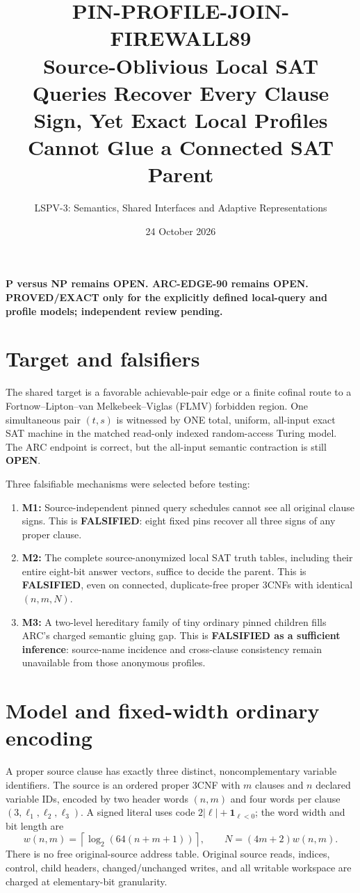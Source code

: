 \documentclass[11pt]{article}
\title{PIN-PROFILE-JOIN-FIREWALL89\\
\large Source-Oblivious Local SAT Queries Recover Every Clause Sign,
Yet Exact Local Profiles Cannot Glue a Connected SAT Parent}
\author{LSPV-3: Semantics, Shared Interfaces and Adaptive Representations}
\date{24 October 2026}
\begin{document}
\maketitle
\begin{center}
\textbf{P versus NP remains OPEN. ARC-EDGE-90 remains OPEN.}\\
\textbf{PROVED/EXACT only for the explicitly defined local-query and profile models; independent review pending.}
\end{center}

\section{Target and falsifiers}
The shared target is a favorable achievable-pair edge or a finite cofinal route to
a Fortnow--Lipton--van Melkebeek--Viglas (FLMV) forbidden region. One simultaneous
pair $(t,s)$ is witnessed by ONE total, uniform, all-input exact SAT machine in
the matched read-only indexed random-access Turing model. The ARC endpoint is
correct, but the all-input semantic contraction is still \textbf{OPEN}.

Three falsifiable mechanisms were selected before testing:
\begin{enumerate}
\item[] \textbf{M1:} Source-independent pinned query schedules cannot see all
original clause signs. This is \textbf{FALSIFIED}: eight fixed pins recover
all three signs of any proper clause.
\item[] \textbf{M2:} The complete source-anonymized local SAT truth tables,
including their entire eight-bit answer vectors, suffice to decide the
parent. This is \textbf{FALSIFIED}, even on connected, duplicate-free
proper 3CNFs with identical $(n,m,N)$.
\item[] \textbf{M3:} A two-level hereditary family of tiny ordinary pinned
children fills ARC's charged semantic gluing gap. This is
\textbf{FALSIFIED as a sufficient inference}: source-name incidence and
cross-clause consistency remain unavailable from those anonymous profiles.
\end{enumerate}

\section{Model and fixed-width ordinary encoding}
A proper source clause has exactly three distinct, noncomplementary variable
identifiers. The source is an ordered proper 3CNF with $m$ clauses and
$n$ declared variable IDs, encoded by two header words $(n,m)$ and four
words per clause $(3,\ell_1,\ell_2,\ell_3)$. A signed literal uses code
$2|\ell|+\mathbf1_{\ell<0}$; the word width and bit length are
\[
 w(n,m)=\left\lceil\log_2(64(n+m+1))\right\rceil,\qquad
 N=(4m+2)w(n,m).
\]
There is no free original-source address table. Original source reads,
indices, control, child headers, changed/unchanged writes, and all writable
workspace are charged at elementary-bit granularity.
\end{document}
